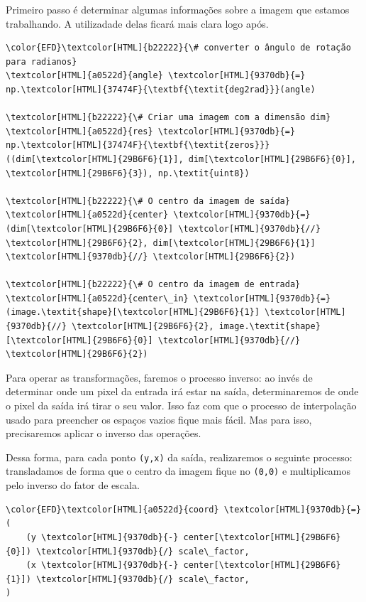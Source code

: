 \documentclass[11pt]{article}
\begin{document}
Primeiro passo é determinar algumas informações sobre a imagem que estamos trabalhando.
A utilizadade delas ficará mais clara logo após.
\begin{Code}
\begin{Verbatim}
\color{EFD}\textcolor[HTML]{b22222}{\# converter o ângulo de rotação para radianos}
\textcolor[HTML]{a0522d}{angle} \textcolor[HTML]{9370db}{=} np.\textcolor[HTML]{37474F}{\textbf{\textit{deg2rad}}}(angle)

\textcolor[HTML]{b22222}{\# Criar uma imagem com a dimensão dim}
\textcolor[HTML]{a0522d}{res} \textcolor[HTML]{9370db}{=} np.\textcolor[HTML]{37474F}{\textbf{\textit{zeros}}}((dim[\textcolor[HTML]{29B6F6}{1}], dim[\textcolor[HTML]{29B6F6}{0}], \textcolor[HTML]{29B6F6}{3}), np.\textit{uint8})

\textcolor[HTML]{b22222}{\# O centro da imagem de saída}
\textcolor[HTML]{a0522d}{center} \textcolor[HTML]{9370db}{=} (dim[\textcolor[HTML]{29B6F6}{0}] \textcolor[HTML]{9370db}{//} \textcolor[HTML]{29B6F6}{2}, dim[\textcolor[HTML]{29B6F6}{1}] \textcolor[HTML]{9370db}{//} \textcolor[HTML]{29B6F6}{2})

\textcolor[HTML]{b22222}{\# O centro da imagem de entrada}
\textcolor[HTML]{a0522d}{center\_in} \textcolor[HTML]{9370db}{=} (image.\textit{shape}[\textcolor[HTML]{29B6F6}{1}] \textcolor[HTML]{9370db}{//} \textcolor[HTML]{29B6F6}{2}, image.\textit{shape}[\textcolor[HTML]{29B6F6}{0}] \textcolor[HTML]{9370db}{//} \textcolor[HTML]{29B6F6}{2})
\end{Verbatim}
\end{Code}

Para operar as transformações, faremos o processo inverso: ao invés de determinar onde um pixel da entrada irá estar na saída, determinaremos de onde o pixel da saída irá tirar o seu valor.
Isso faz com que o processo de interpolação usado para preencher os espaços vazios fique mais fácil.
Mas para isso, precisaremos aplicar o inverso das operações.

Dessa forma, para cada ponto \texttt{(y,x)} da saída, realizaremos o seguinte processo: transladamos de forma que o centro da imagem fique no \texttt{(0,0)} e multiplicamos pelo inverso do fator de escala.
\begin{Code}
\begin{Verbatim}
\color{EFD}\textcolor[HTML]{a0522d}{coord} \textcolor[HTML]{9370db}{=} (
    (y \textcolor[HTML]{9370db}{-} center[\textcolor[HTML]{29B6F6}{0}]) \textcolor[HTML]{9370db}{/} scale\_factor,
    (x \textcolor[HTML]{9370db}{-} center[\textcolor[HTML]{29B6F6}{1}]) \textcolor[HTML]{9370db}{/} scale\_factor,
)
\end{Verbatim}
\end{Code}
\end{document}
